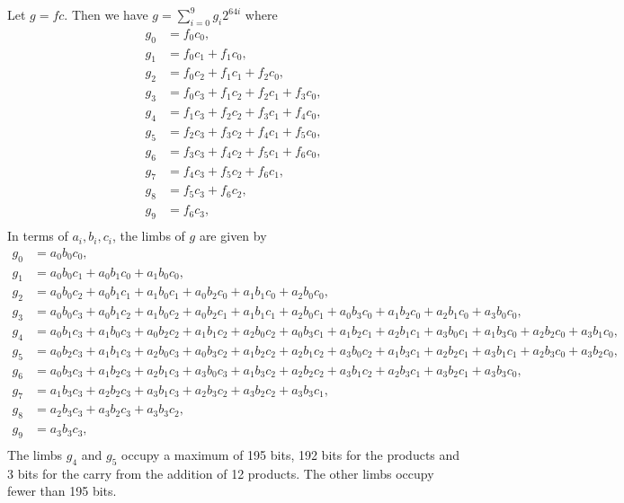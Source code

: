 \documentclass[a4paper, 12pt]{article}
\begin{document}
Let $g = fc$. Then we have $g = \sum_{i=0}^{9} g_i 2^{64i}$ where
\begin{align*}
  g_0 & = f_0c_0,\\
  g_1 & = f_0c_1 + f_1c_0,\\
  g_2 & = f_0c_2 + f_1c_1 + f_2c_0,\\
  g_3 & = f_0c_3 + f_1c_2 + f_2c_1 + f_3c_0,\\
  g_4 & = f_1c_3 + f_2c_2 + f_3c_1 + f_4c_0,\\
  g_5 & = f_2c_3 + f_3c_2 + f_4c_1 + f_5c_0,\\
  g_6 & = f_3c_3 + f_4c_2 + f_5c_1 + f_6c_0,\\
  g_7 & = f_4c_3 + f_5c_2 + f_6c_1,\\
  g_8 & = f_5c_3 + f_6c_2,\\
  g_9 & = f_6c_3,\\
\end{align*}
In terms of $a_i,b_i,c_i$, the limbs of $g$ are given by
\begin{align*}
  g_0 & = a_0b_0c_0,\\
  g_1 & = a_0b_0c_1 + a_0b_1c_0 + a_1b_0c_0,\\
  g_2 & = a_0b_0c_2 + a_0b_1c_1 + a_1b_0c_1 + a_0b_2c_0 + a_1b_1c_0 + a_2b_0c_0,\\
  g_3 & = a_0b_0c_3 + a_0b_1c_2 + a_1b_0c_2 + a_0b_2c_1 + a_1b_1c_1 + a_2b_0c_1 + a_0b_3c_0 + a_1b_2c_0 + a_2b_1c_0 + a_3b_0c_0,\\
  g_4 & = a_0b_1c_3 + a_1b_0c_3 + a_0b_2c_2 + a_1b_1c_2 + a_2b_0c_2 + a_0b_3c_1 + a_1b_2c_1 + a_2b_1c_1 + a_3b_0c_1 + a_1b_3c_0 + a_2b_2c_0 + a_3b_1c_0,\\
  g_5 & = a_0b_2c_3 + a_1b_1c_3 + a_2b_0c_3 + a_0b_3c_2 + a_1b_2c_2 + a_2b_1c_2 + a_3b_0c_2 + a_1b_3c_1 + a_2b_2c_1 + a_3b_1c_1 + a_2b_3c_0 + a_3b_2c_0,\\
  g_6 & = a_0b_3c_3 + a_1b_2c_3 + a_2b_1c_3 + a_3b_0c_3 + a_1b_3c_2 + a_2b_2c_2 + a_3b_1c_2 + a_2b_3c_1 + a_3b_2c_1 + a_3b_3c_0,\\
  g_7 & = a_1b_3c_3 + a_2b_2c_3 + a_3b_1c_3 + a_2b_3c_2 + a_3b_2c_2 + a_3b_3c_1,\\
  g_8 & = a_2b_3c_3 + a_3b_2c_3 + a_3b_3c_2,\\
  g_9 & = a_3b_3c_3,\\
\end{align*}
The limbs $g_4$ and $g_5$ occupy a maximum of 195 bits, 192 bits for the products and 3 bits for the carry from the addition of 12 products. The other limbs occupy fewer than 195 bits.
\end{document}

